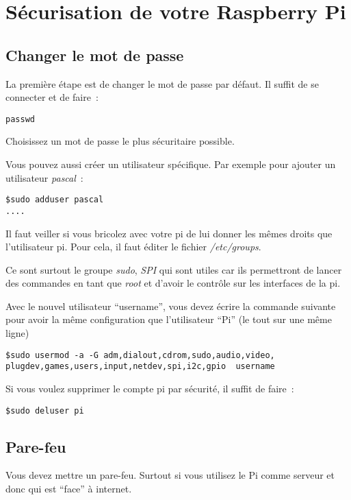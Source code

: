 \section{Sécurisation de votre Raspberry Pi}

\subsection{Changer le mot de passe}

La première étape est de changer le mot de passe par défaut. Il suffit de se connecter et de faire~:
\begin{verbatim}
passwd
\end{verbatim}

Choisissez un mot de passe le plus sécuritaire possible. 

Vous pouvez aussi créer un utilisateur spécifique. Par exemple pour ajouter un utilisateur \emph{pascal}~:
\begin{verbatim}
$sudo adduser pascal
....
\end{verbatim}

Il faut veiller si vous bricolez avec votre pi de lui donner les mêmes droits que l'utilisateur pi. Pour cela, il faut éditer le fichier \emph{/etc/groups}.

Ce sont surtout le groupe \emph{sudo}, \emph{SPI} qui sont utiles car ils permettront de lancer des commandes en tant que \emph{root} et d'avoir le contrôle sur les interfaces de la pi.

Avec le nouvel utilisateur ``username'', vous devez écrire la commande suivante pour avoir la même configuration que l'utilisateur ``Pi'' (le tout sur une même ligne)

\begin{verbatim}
$sudo usermod -a -G adm,dialout,cdrom,sudo,audio,video,
plugdev,games,users,input,netdev,spi,i2c,gpio  username
\end{verbatim}

Si vous voulez supprimer le compte pi par sécurité, il suffit de faire~:
\begin{verbatim}
$sudo deluser pi
\end{verbatim}

\subsection{Pare-feu}

Vous devez mettre un pare-feu. Surtout si vous utilisez le Pi comme serveur et donc qui est ``face'' à internet. 

